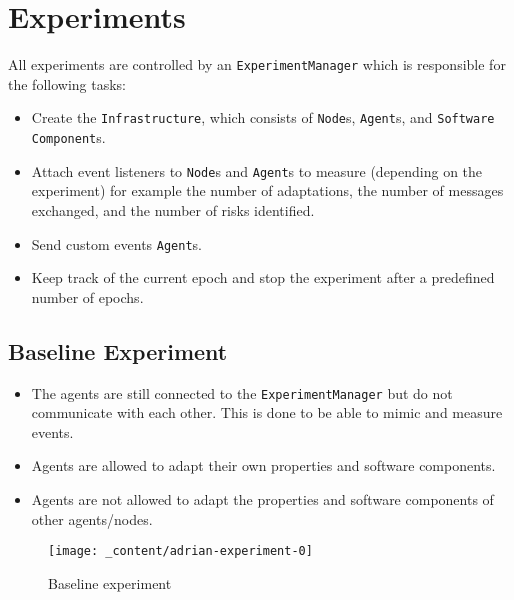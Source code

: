 \section{Experiments}
\label{sec:experiments}


All experiments are controlled by an \texttt{ExperimentManager} which is responsible for the following tasks:
\begin{itemize}
    \item Create the \texttt{Infrastructure}, which consists of \texttt{Node}s, \texttt{Agent}s, and \texttt{Software Component}s.
    \item Attach event listeners to \texttt{Node}s and \texttt{Agent}s to measure (depending on the experiment) for example the number of adaptations, the number of messages exchanged, and the number of risks identified.
    \item Send custom events \texttt{Agent}s.
    \item Keep track of the current epoch and stop the experiment after a predefined number of epochs.
\end{itemize}

\subsection{Baseline Experiment}


\begin{itemize}
    \item The agents are still connected to the \texttt{ExperimentManager} but do not communicate with each other. This is done to be able to mimic and measure events.
    \item Agents are allowed to adapt their own properties and software components.
    \item Agents are not allowed to adapt the properties and software components of other agents/nodes.
\end{itemize}

\begin{figure}[H]
    \centering
    \texttt{[image: \_content/adrian-experiment-0]}
    \caption{Baseline experiment}
    \label{fig:baseline}
\end{figure}

